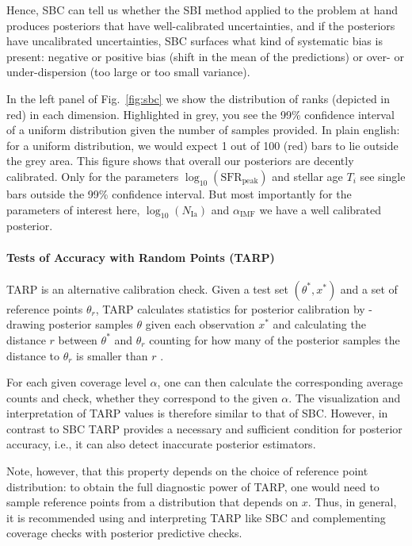 \documentclass{aa}
\begin{document}
\begin{appendix}
Hence, SBC can tell us whether the SBI method applied to the problem at hand produces posteriors that have well-calibrated uncertainties, and if the posteriors have uncalibrated uncertainties, SBC surfaces what kind of systematic bias is present: negative or positive bias (shift in the mean of the predictions) or over- or under-dispersion (too large or too small variance).

In the left panel of Fig.~\ref{fig:sbc} we show the distribution of ranks (depicted in red) in each dimension. Highlighted in grey, you see the 99\% confidence interval of a uniform distribution given the number of samples provided. In plain english: for a uniform distribution, we would expect 1 out of 100 (red) bars to lie outside the grey area. This figure shows that overall our posteriors are decently calibrated. Only for the parameters $\log_{10}\left(\mathrm{SFR}_\mathrm{peak}\right)$ and stellar age $T_i$ see single bars outside the 99\% confidence interval. But most importantly for the parameters of interest here, $\log_{10}\left(N_\mathrm{Ia}\right)$ and $\alpha_\mathrm{IMF}$ we have a well calibrated posterior.

\paragraph{Tests of Accuracy with Random Points (TARP)}

TARP \citep{Lemos2023} is an alternative calibration check. Given a test set $(\theta^*,x^*)$ and a set of reference points $\theta_r$, TARP calculates statistics for posterior calibration by - drawing posterior samples $\theta$ given each observation $x^*$ and calculating the distance $r$ between $\theta^*$ and $\theta_r$ counting for how many of the posterior samples the distance to $\theta_r$ is smaller than $r$ \citep[see e.g. Fig.~2 in][for an illustration]{Lemos2023}.

For each given coverage level $\alpha$, one can then calculate the corresponding average counts and check, whether they correspond to the given $\alpha$. The visualization and interpretation of TARP values is therefore similar to that of SBC. However, in contrast to SBC TARP provides a necessary and sufficient condition for posterior accuracy, i.e., it can also detect inaccurate posterior estimators.

Note, however, that this property depends on the choice of reference point distribution: to obtain the full diagnostic power of TARP, one would need to sample reference points from a distribution that depends on $x$. Thus, in general, it is recommended using and interpreting TARP like SBC and complementing coverage checks with posterior predictive checks.

\end{appendix}
\end{document}

